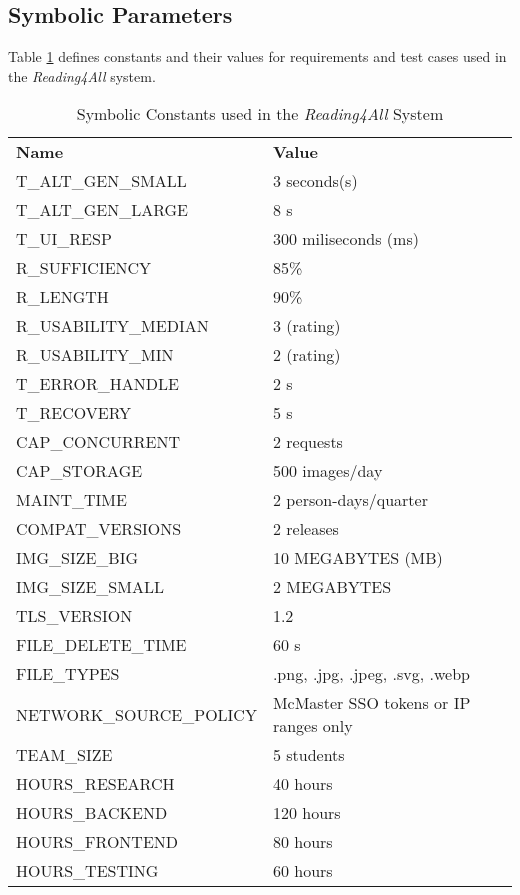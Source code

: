 \documentclass[12pt, titlepage]{article}
\begin{document}
\newpage 
\subsection{Symbolic Parameters}

Table \ref{tab:symbolic-constants} defines constants and their values for requirements and test cases used
in the \textit{Reading4All} system.

\begin{longtable}{|p{8.0cm}|p{8.0cm}|}
  \captionsetup{justification=raggedright,singlelinecheck=false}
  \caption{Symbolic Constants used in the \textit{Reading4All} System}
  \label{tab:symbolic-constants} \\
  \toprule
  {\textbf{Name}} & {\textbf{Value}}\\
  \midrule
  T\_ALT\_GEN\_SMALL & 3 seconds(s) \\
  T\_ALT\_GEN\_LARGE & 8 s \\
  T\_UI\_RESP & 300 miliseconds (ms) \\
  R\_SUFFICIENCY & 85\% \\
  R\_LENGTH & 90\% \\
  R\_USABILITY\_MEDIAN & 3 (rating) \\
  R\_USABILITY\_MIN & 2 (rating) \\
  T\_ERROR\_HANDLE & 2 s \\
  T\_RECOVERY & 5 s \\
  CAP\_CONCURRENT & 2 requests \\
  CAP\_STORAGE & 500 images/day \\
  MAINT\_TIME & 2 person-days/quarter \\
  COMPAT\_VERSIONS & 2 releases \\
  IMG\_SIZE\_BIG & 10 MEGABYTES (MB) \\
  IMG\_SIZE\_SMALL & 2 MEGABYTES \\
  TLS\_VERSION & 1.2 \\
  FILE\_DELETE\_TIME & 60 s \\
  FILE\_TYPES & .png, .jpg, .jpeg, .svg, .webp \\
  NETWORK\_SOURCE\_POLICY & McMaster SSO tokens or IP ranges only\\
  TEAM\_SIZE & 5 students \\
  HOURS\_RESEARCH & 40 hours \\
  HOURS\_BACKEND & 120 hours \\
  HOURS\_FRONTEND & 80 hours \\
  HOURS\_TESTING & 60 hours \\

\end{longtable}
\end{document}
